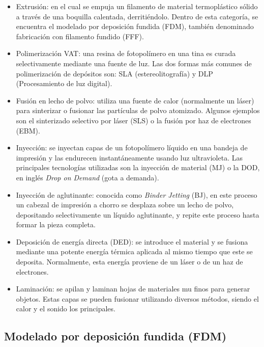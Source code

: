 \documentclass{report}
\begin{document}
\begin{itemize}
\item Extrusión: en el cual se empuja un filamento de material termoplástico sólido a través de una boquilla calentada, derritiéndolo. Dentro de esta categoría, se encuentra el modelado por deposición fundida (FDM), también denominado fabricación con filamento fundido (FFF).


\item Polimerización VAT: una resina de fotopolímero en una tina es curada selectivamente mediante una fuente de luz. Las dos formas más comunes de polimerización de depósitos son: SLA (estereolitografía) y DLP (Procesamiento de luz digital).

\item Fusión en lecho de polvo: utiliza una fuente de calor (normalmente un láser) para sinterizar o fusionar las partículas de polvo atomizado. Algunos ejemplos son el sinterizado selectivo por láser (SLS) o la fusión por haz de electrones (EBM).

\item Inyección: se inyectan capas de un fotopolímero líquido en una bandeja de impresión y las endurecen instantáneamente usando luz ultravioleta. Las principales tecnologías utilizadas son la inyección de material (MJ) o la DOD, en inglés \textit{Drop on Demand} (gota a demanda).

\item Inyección de aglutinante: conocida como \textit{Binder Jetting} (BJ), en este proceso un cabezal de impresión a chorro se desplaza sobre un lecho de polvo, depositando selectivamente un líquido aglutinante, y repite este proceso hasta formar la pieza completa.

\item Deposición de energía directa (DED): se introduce el material y se fusiona mediante una potente energía térmica aplicada al mismo tiempo que este se deposita. Normalmente, esta energía proviene de un láser o de un haz de electrones.

\item Laminación: se apilan y laminan hojas de materiales mu finos para generar objetos. Estas capas se pueden fusionar utilizando diversos métodos, siendo el calor y el sonido los principales.

\end{itemize}

 
\subsection{Modelado por deposición fundida (FDM)}
\end{document}
